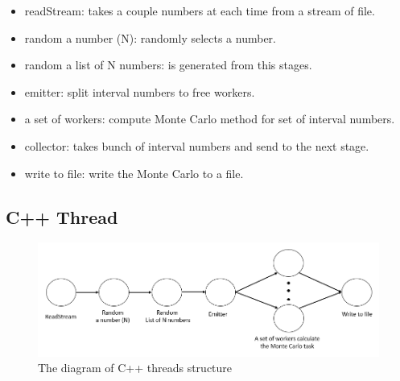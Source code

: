 \documentclass[runningheads,a4paper]{llncs}
\begin{document}
\begin{itemize}
\item readStream: takes a couple numbers at each time from a stream of file.
\item random a number (N): randomly selects a number.
\item random a list of N numbers: is generated from this stages.
\item emitter: split interval numbers to free workers.
\item a set of workers: compute Monte Carlo method for set of interval numbers.
\item collector: takes bunch of interval numbers and send to the next stage.
\item write to file: write the Monte Carlo to a file.
\end{itemize}

\subsection{C++ Thread}
\label{subsec:thread}

\begin{figure}[h!]
	\centering
	\includegraphics[scale = 0.4]{image/threadStructure}	
	\caption{The diagram of C++ threads structure}
	\label{Fig:threadStructure}
\end{figure}
\end{document}
